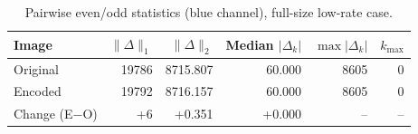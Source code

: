 
\begin{table}[H]\centering
\caption{Pairwise even/odd statistics (blue channel), full-size low-rate case.}
\begin{tabular}{lrrrrr}
\toprule
Image & $\|\Delta\|_{1}$ & $\|\Delta\|_{2}$ & Median $|\Delta_k|$ & $\max |\Delta_k|$ & $k_{\max}$ \\
\midrule
Original & 19786 & 8715.807 & 60.000 & 8605 & 0 \\
Encoded  & 19792 & 8716.157 & 60.000 & 8605 & 0 \\
\midrule
Change (E$-$O) & +6 & +0.351 & +0.000 & -- & -- \\
\bottomrule
\end{tabular}
\end{table}
